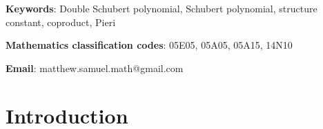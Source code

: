 \documentclass{amsart}
\newtheorem{theorem}{Theorem}[section]
\theoremstyle{definition}
\theoremstyle{remark}
\numberwithin{equation}{subsection}
\DeclareMathOperator{\sch}{\mathfrak{S}}
\newcommand{\tom}[1]{\xrightarrow{#1}}
\begin{document}
\maketitle

{\bf Keywords}: Double Schubert polynomial, Schubert polynomial, structure constant, coproduct, Pieri

{\bf Mathematics classification codes}: 05E05, 05A05, 05A15, 14N10

{\bf Email}: matthew.samuel.math@gmail.com




\newcommand{\dsch}{\ensuremath{\Xi}}
\newcommand{\coma}{\mathcal{A}}
\newcommand{\dcoma}{\mathcal{D}}


\tableofcontents

\section*{Introduction}



\end{document}
